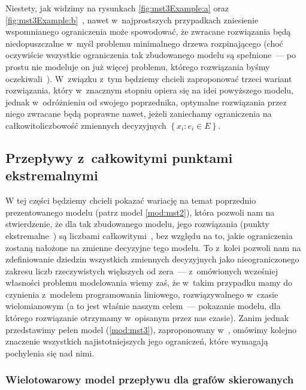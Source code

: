 Niestety, jak widzimy na rysunkach \ref{fig:mst3Example:a} oraz \ref{fig:mst3Example:b}~\cite[$41$]{Magnanti1995503}, nawet w~najprostszych przypadkach zniesienie wspomnianego ograniczenia może spowodować, że zwracane rozwiązania będą niedopuszczalne w~myśl problemu minimalnego drzewa rozpinającego (choć oczywiście wszystkie ograniczenia tak zbudowanego modelu są spełnione~--- po prostu nie modeluje on już więcej problemu, którego rozwiązania byśmy oczekiwali~\cite[$39$]{Magnanti1995503}).
W~związku z~tym będziemy chcieli zaproponować trzeci wariant rozwiązania, który w~znacznym stopniu opiera się na idei powyższego modelu, jednak w~odróżnieniu od swojego poprzednika, optymalne rozwiązania przez niego zwracane będą poprawne nawet, jeżeli zaniechamy ograniczenia na całkowitoliczbowość zmiennych decyzyjnych $\left\{ x_{i} : e_{i} \in E \right\}$.



\subsection{Przepływy z~całkowitymi punktami ekstremalnymi}



W tej części będziemy chcieli pokazać wariację na temat poprzednio prezentowanego modelu (patrz model \ref{mod:mst2}), która pozwoli nam na stwierdzenie, że dla tak zbudowanego modelu, jego rozwiązania (punkty ekstremalne~\cite{Papadimitriou:1982:COA:31027}) są liczbami całkowitymi~\cite[$42$--$46$]{Magnanti1995503}, bez względu na to, jakie ograniczenia zostaną nałożone na zmienne decyzyjne tego modelu.
To z~kolei pozwoli nam na zdefiniowanie dziedzin wszystkich zmiennych decyzyjnych jako nieograniczonego zakresu liczb rzeczywistych większych od zera~--- z~omówionych wcześniej własności problemu modelowania wiemy zaś, że w~takim przypadku mamy do czynienia z~modelem programowania liniowego, rozwiązywalnego w~czasie wielomianowym (a to jest właśnie naszym celem~--- pokazanie modelu, dla którego rozwiązanie otrzymamy w~opisanym przez nas czasie).
Zanim jednak przedstawimy pełen model (\ref{mod:mst3}), zaproponowany w~\cite[$42$--$46$]{Magnanti1995503}, omówimy kolejno znaczenie wszystkich najistotniejszych jego ograniczeń, które wymagają pochylenia się nad nimi.


\subsubsection{Wielotowarowy model przepływu dla grafów skierowanych} 


